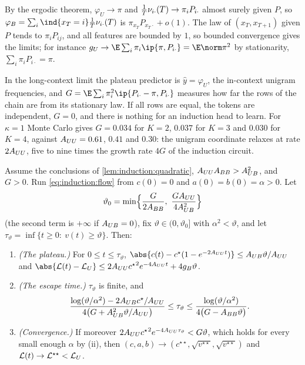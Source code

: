 \begin{refsection}
\begin{proofsketch}
By the ergodic theorem, $\varphi_U\to\pi$ and $\frac1T\nu_{i\cdot}(T)\to\pi_iP_{i\cdot}$ almost surely given $P$, so $\varphi_B=\sum_i\ind\{x_T=i\}\frac1T\indcnt_{i\cdot}(T)$ is $\pi_{x_T}P_{x_T\cdot}+o(1)$. The law of $(x_T,x_{T+1})$ given $P$ tends to $\pi_iP_{ij}$, and all features are bounded by $1$, so bounded convergence gives the limits; for instance $g_U\to\E\sum_{i}\pi_i\ip{\pi,P_{i\cdot}}=\E\norm\pi^2$ by stationarity, $\sum_i\pi_iP_{i\cdot}=\pi$.
\end{proofsketch}

In the long-context limit the plateau predictor is $\hat y=\varphi_U$, the in-context unigram frequencies, and $G=\E\sum_i\pi_i^2\ip{P_{i\cdot}-\pi,P_{i\cdot}}$ measures how far the rows of the chain are from its stationary law. If all rows are equal, the tokens are independent, $G=0$, and there is nothing for an induction head to learn. For $\kappa=1$ Monte Carlo gives $G=0.034$ for $K=2$, $0.037$ for $K=3$ and $0.030$ for $K=4$, against $A_{UU}=0.61$, $0.41$ and $0.30$: the unigram coordinate relaxes at rate $2A_{UU}$, five to nine times the growth rate $4G$ of the induction circuit.

\begin{theorem}\label{thm:induction:escape}
Assume the conclusions of \cref{lem:induction:quadratic}, $A_{UU}A_{BB}>A_{UB}^2$, and $G>0$. Run \eqref{eq:induction:flow} from $c(0)=0$ and $a(0)=b(0)=\alpha>0$. Let
\[
  \vartheta_0=\min\Bigl\{\frac G{2A_{BB}},\ \frac{GA_{UU}}{4A_{UB}^2}\Bigr\}
\]
(the second term is $+\infty$ if $A_{UB}=0$), fix $\vartheta\in(0,\vartheta_0]$ with $\alpha^2<\vartheta$, and let $\tau_\vartheta=\inf\{t\ge0:\ v(t)\ge\vartheta\}$. Then:
\begin{enumerate}
\item \emph{(The plateau.)} For $0\le t\le\tau_\vartheta$, $\abs{c(t)-c^\star(1-e^{-2\indAU t})}\le\indAX\vartheta/\indAU$ and $\abs{\Loss(t)-\indLU}\le2\indAU{c^\star}^2e^{-4\indAU t}+4g_B\vartheta$.
\item \emph{(The escape time.)} $\tau_\vartheta$ is finite, and
\[
  \frac{\log(\vartheta/\alpha^2)-2A_{UB} c^\star/A_{UU}}{4\bigl(G+A_{UB}^2\vartheta/A_{UU}\bigr)}\le\tau_\vartheta\le\frac{\log(\vartheta/\alpha^2)}{4\bigl(G-A_{BB}\vartheta\bigr)} .
\]
\item \emph{(Convergence.)} If moreover $2A_{UU}{c^\star}^2e^{-4A_{UU}\tau_\vartheta}<G\vartheta$, which holds for every small enough $\alpha$ by (ii), then $(c,a,b)\to(c^{\star\star},\sqrt{v^{\star\star}},\sqrt{v^{\star\star}})$ and $\mathcal{L}(t)\to\mathcal{L}^{\star\star}<\mathcal{L}_{U}$.
\end{enumerate}
\end{theorem}


\end{refsection}
